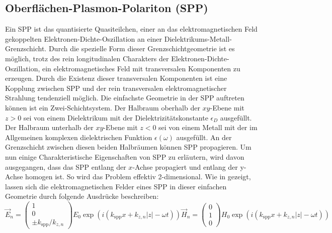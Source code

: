 \documentclass[titlepage]{article}
\begin{document}
	\subsection{Oberflächen-Plasmon-Polariton (SPP)}		
	Ein SPP ist das quantisierte Quasiteilchen, einer an das elektromagnetischen Feld gekoppelten Elektronen-Dichte-Oszillation an einer Dielektrikums-Metall-Grenzschicht. Durch die spezielle Form dieser Grenzschichtgeometrie ist es möglich, trotz des rein longitudinalen Charakters der Elektronen-Dichte-Oszillation, ein elektromagnetisches Feld mit transversalen Komponenten zu erzeugen. Durch die Existenz dieser transversalen Komponenten ist eine Kopplung zwischen SPP und der rein transversalen elektromagnetischer Strahlung tendenziell möglich. Die einfachste Geometrie in der SPP auftreten können ist ein Zwei-Schichtsystem. Der Halbraum oberhalb der $xy$-Ebene mit $z>0$ sei von einem Dielektrikum mit der Dielektrizitätskonstante $\epsilon_D$ ausgefüllt. Der Halbraum unterhalb der $xy$-Ebene mit $z<0$ sei von einem Metall mit der im Allgemeinen komplexen dielektrischen Funktion $\epsilon(\omega)$ ausgefüllt. An der Grenzschicht zwischen diesen beiden Halbräumen können SPP propagieren. Um nun einige Charakteristische Eigenschaften von SPP zu erläutern, wird davon ausgegangen, dass das SPP entlang der $x$-Achse propagiert und entlang der y-Achse homogen ist. So wird das Problem effektiv 2-dimensional. Wie in \cite{Maier.2007} gezeigt, lassen sich die elektromagnetischen Felder eines SPP in dieser einfachen Geometrie durch folgende Ausdrücke beschreiben:
	\begin{subequations}
		\label{eq:fields_spp}
	 \begin{equation}
	 	\label{eq:electric_field_spp}
	 	\vec{E}_n = \begin{pmatrix} 1 \\ 0 \\ \pm k_{\mathrm{spp}}/k_{z,n} \end{pmatrix} E_0 \exp\left(i(k_{\mathrm{spp}}x + k_{z, n}|z|-\omega t)\right)	
	 \end{equation}
	 \begin{equation}
	 	\label{eq:magnetic_field_spp}
	 	\vec{H}_n = \begin{pmatrix} 0 \\ 1 \\ 0 \end{pmatrix} H_0 \exp\left(i(k_{\mathrm{spp}}x + k_{z, n}|z|-\omega t)\right)
	 \end{equation}
	\end{subequations}
	
\end{document}
